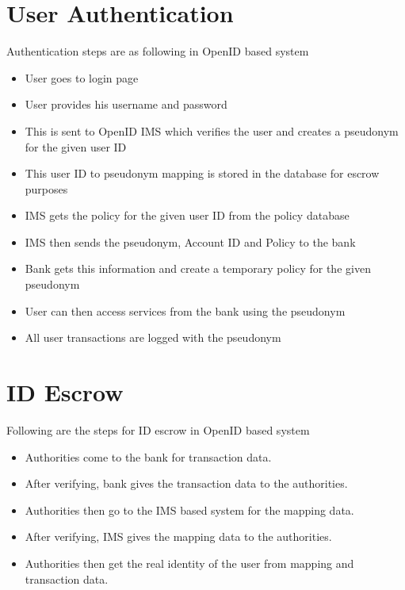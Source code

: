 \section{User Authentication}
Authentication steps are as following in OpenID based system
\begin{itemize}
	\item User goes to login page
	\item User provides his username and password
	\item This is sent to OpenID IMS which verifies the user and creates a pseudonym for the given user ID
	\item This user ID to pseudonym mapping is stored in the database for escrow purposes
	\item IMS gets the policy for the given user ID from the policy database
	\item IMS then sends the pseudonym, Account ID and Policy to the bank 
	\item Bank gets this information and create a temporary policy for the given pseudonym
	\item User can then access services from the bank using the pseudonym
	\item All user transactions are logged with the pseudonym
\end{itemize}
\section{ID Escrow}
Following are the steps for ID escrow in OpenID based system
\begin{itemize}
	\item Authorities come to the bank for transaction data.
	\item After verifying, bank gives the transaction data to the authorities.
	\item Authorities then go to the IMS based system for the mapping data.
	\item After verifying, IMS gives the mapping data to the authorities.
	\item Authorities then get the real identity of the user from mapping and transaction data.
\end{itemize}
